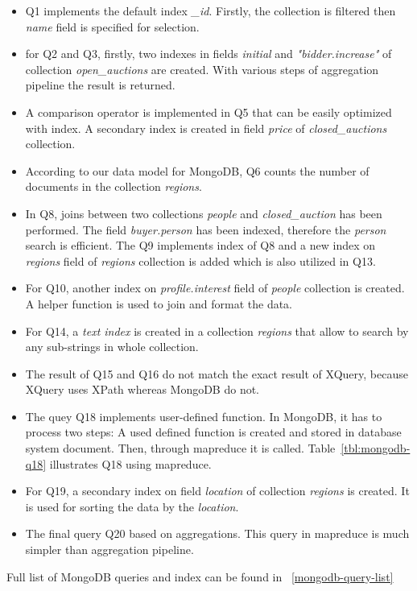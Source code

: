 \begin{itemize}
\item Q1 implements the default index \textit{\_id}. Firstly, the collection is filtered then \textit{name} field is specified for selection. 

\item for Q2 and Q3, firstly, two indexes in fields \textit{initial} and \textit{"bidder.increase"} of collection \textit{open\_auctions} are created. With various steps of aggregation pipeline the result is returned.

\item A comparison operator is implemented in Q5 that can be easily optimized with index. A secondary index is created in field \textit{price} of \textit{closed\_auctions} collection. 
\item According to our data model for MongoDB, Q6 counts the number of documents in the collection \textit{regions}.
\item In Q8, joins between two collections \textit{people} and \textit{closed\_auction} has been performed. The field \textit{buyer.person} has been indexed, therefore the \textit{person} search is efficient. 
The Q9 implements index of Q8 and a new index on \textit{regions} field of \textit{regions} collection is added which is also utilized in Q13.
\item For Q10, another index on \textit{profile.interest} field of \textit{people} collection is created. A helper function is used to join and format the data.
\item For Q14, a \textit{text index} is created in a collection \textit{regions} that allow to search by any sub-strings in whole collection. 
\item The result of Q15 and Q16 do not match the exact result of XQuery, because  XQuery uses  XPath whereas MongoDB do not.

\item The quey Q18 implements user-defined function. In MongoDB, it has to process two steps: A used defined function is created and stored in database system document. Then, through mapreduce it is called. Table~\ref{tbl:mongodb-q18} illustrates Q18 using mapreduce.

\item For Q19, a secondary index on field \textit{location} of collection \textit{regions} is created.
It is used for sorting the data by the \textit{location}. 
\item
The final query Q20 based on aggregations. This query in mapreduce  is much simpler than aggregation pipeline.
\end{itemize}
Full list of MongoDB queries and index can be found in ~\ref{mongodb-query-list}

